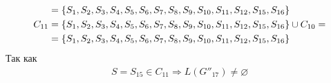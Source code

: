 \begin{itemize}
\begin{align*}
		             & = \left\{S_1, S_2, S_3, S_4, S_5, S_6, S_7, S_8, S_9, S_{10}, S_{11}, S_{12}, S_{15}, S_{16}\right\}               \\
		      C_{11} & = \left\{S_1, S_2, S_3, S_4, S_5, S_6, S_7, S_8, S_9, S_{10}, S_{11}, S_{12}, S_{15}, S_{16}\right\} \cup C_{10} = \\
		             & = \left\{S_1, S_2, S_3, S_4, S_5, S_6, S_7, S_8, S_9, S_{10}, S_{11}, S_{12}, S_{15}, S_{16}\right\}
	      \end{align*}
	      Так как
	      \begin{align}
		      S = S_{15} \in C_{11} \Longrightarrow L(G''_{17}) \not= \varnothing
	      \end{align}
\end{itemize}
